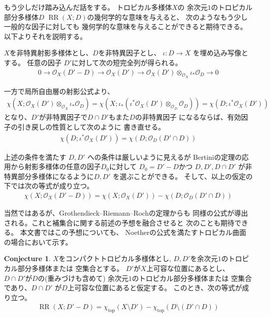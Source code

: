 \documentclass[a4paper,dvipdfmx,reqno,12pt]{amsart}
\theoremstyle{definition}
\newtheorem{conjecture}[theorem]{Conjecture}
\newcommand{\opn}[1]{\operatorname{#1}}
\numberwithin{equation}{section}
\begin{document}
もう少しだけ踏み込んだ話をする。
トロピカル多様体$X$の
余次元$1$のトロピカル部分多様体$D$
$\opn{RR}(X;D)$の幾何学的な意味を与えると、
次のようなもう少し一般的な因子に対しても
幾何学的な意味を与えることができると期待できる。
以下よりそれを説明する。

$X$を非特異射影多様体とし、$D$を非特異因子とし、
$\iota\colon D\to X$ を埋め込み写像とする。
任意の因子 $D'$に対して次の短完全列が得られる。
\begin{align}
0 \to \mathcal{O}_X(D'-D)\to \mathcal{O}_X(D')
\to \mathcal{O}_X(D')
\otimes_{\mathcal{O}_X} \iota_*\mathcal{O}_D \to 0 
\end{align}

一方で局所自由層の射影公式より、
\begin{align}
\chi(X;\mathcal{O}_X(D')\otimes_{\mathcal{O}_X} \iota_*\mathcal{O}_D)
=\chi(X;\iota_*(\iota^{*}\mathcal{O}_X(D')\otimes_{\mathcal{O}_D} \mathcal{O}_D))
=\chi(D;\iota^{*}\mathcal{O}_X(D'))
\end{align}
となり、$D'$が非特異因子で$D\cap D'$もまた$D$の非特異因子
になるならば、有効因子の引き戻しの性質として次のように
書き直せる。
\begin{align}
\chi(D;\iota^{*}\mathcal{O}_X(D'))=\chi(D;\mathcal{O}_D(D'\cap D))
\end{align}

上述の条件を満たす $D,D'$ への条件は厳しいように見えるが
Bertiniの定理の応用から射影多様体の任意の因子$D_0$に対して
$D_0=D'-D$かつ
$D,D',D\cap D'$ が非特異部分多様体になるように$D,D'$
を選ぶことができる。
そして、以上の仮定の下では次の等式が成り立つ。
\begin{align}
\chi(X;\mathcal{O}_X(D'-D))=
\chi(X;\mathcal{O}_X(D'))-
\chi(D;\mathcal{O}_D(D'\cap D))
\end{align}

当然ではあるが、Grothendieck--Riemann--Rochの定理からも
同様の公式が導出される。これと補集合に関する前述の予想を融合させると
次のことも期待できる。
本文書ではこの予想についても、
Noetherの公式を満たすトロピカル曲面の場合において示す。
\begin{conjecture}
\label{conjecture-rr-bertini}
$X$をコンパクトトロピカル多様体とし, 
$D,D'$を余次元$1$のトロピカル部分多様体または
空集合とする。
$D'$が$X$上可容な位置にあるとし、
$D\cap D'$が$D$の(重みづけも含めて)
余次元$1$のトロピカル部分多様体または
空集合であり、$D\cap D'$ が$D$上可容な位置にあると仮定する。
このとき、次の等式が成り立つ。
\begin{align}
\opn{RR}(X;D'-D)=\chi_{\opn{top}}(X\setminus D')-
\chi_{\opn{top}}(D\setminus (D'\cap D))
\end{align}

\end{conjecture}
\end{document}

